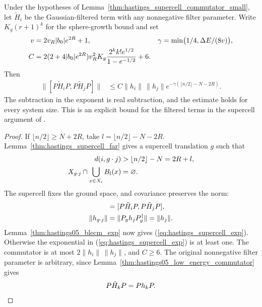 \begin{lemma}
    \label{thm:hastings_supercell_commutator_exp}
    \leanok
    Under the hypotheses of Lemma~\ref{thm:hastings_supercell_commutator_small},
    let $\tilde H_i$ be the Gaussian-filtered term with any nonnegative
    filter parameter. Write $K_g(r+1)^{k}$ for the sphere-growth bound and set
    \begin{align}
        v      & =2v_R|b_0|e^{2R}+1,                       &
        \gamma & =\min\bigl(1/4,\Delta E/(8v)\bigr),\notag   \\
        C      & =2(2+4|b_0|e^{2R})v_R^2K_g
        \frac{2^{k}k!e^{1/2}}{1-e^{-1/2}}+6.\notag
    \end{align}
    Then
    \begin{align}
        \|[P\tilde H_iP,P\tilde H_jP]\|
         & \le C\|h_i\|\,\|h_j\|
        e^{-\gamma(\lfloor n/2\rfloor-N-2R)}.
        \label{eq:hastings_supercell_exp}
    \end{align}
    The subtraction in the exponent is real subtraction, and the estimate
    holds for every system size. This is an explicit bound for the filtered
    terms in the supercell argument of
    \cite[lines 1620--1641]{Hastings2006Solving}.
\end{lemma}
\begin{proof}\leanok
    If $\lfloor n/2\rfloor\ge N+2R$, take
    $l=\lfloor n/2\rfloor-N-2R$.
    Lemma~\ref{thm:hastings_supercell_far} gives a supercell translation $g$
    such that
    \begin{align}
        d(i,g\cdot j)                            & >\lfloor n/2\rfloor-N=2R+l,\notag \\
        X_{g\cdot j}\cap\bigcup_{x\in X_i}B_l(x) & =\varnothing.\notag
    \end{align}
    The supercell fixes the ground space, and covariance preserves the norm:
    \begin{align}
        [P\tilde H_iP,P\tilde H_{g\cdot j}P]
                         & =[P\tilde H_iP,P\tilde H_jP],\notag   \\
        \|h_{g\cdot j}\| & =\|P_gh_jP_g^\dagger\|=\|h_j\|.\notag
    \end{align}
    Lemma~\ref{thm:hastings05_blecm_exp} now gives
    (\ref{eq:hastings_supercell_exp}).
    Otherwise the exponential in (\ref{eq:hastings_supercell_exp}) is at least
    one. The commutator is at most $2\|h_i\|\,\|h_j\|$, and $C\ge6$.
    The original nonnegative filter parameter is arbitrary, since
    Lemma~\ref{thm:hastings05_low_energy_commutator} gives
    \begin{align}
        P\tilde H_kP=Ph_kP.\notag
    \end{align}
\end{proof}

